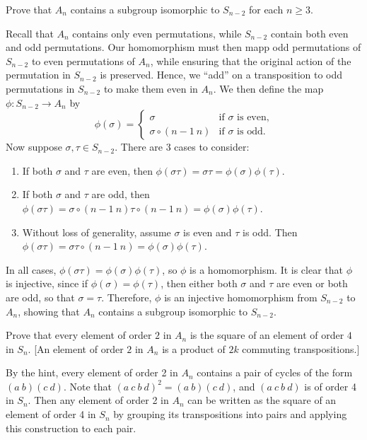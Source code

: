 \begin{problems}
\begin{sol}
    \end{sol}
    \item Prove that $A_n$ contains a subgroup isomorphic to $S_{n-2}$ for each $n\ge3$.
    \begin{sol}
        Recall that $A_n$ contains only even permutations, while $S_{n - 2}$ contain both even and odd permutations. Our homomorphism must then mapp odd permutations of $S_{n - 2}$ to even permutations of $A_n$, while ensuring that the original action of the permutation in $S_{n - 2}$ is preserved. Hence, we ``add'' on a transposition to odd permutations in $S_{n - 2}$ to make them even in $A_n$. We then define the map $\phi: S_{n - 2} \to A_n$ by
        \[\phi(\sigma) = 
        \begin{cases}
            \sigma & \text{if $\sigma$ is even,}\\
            \sigma \circ (n - 1\ n) & \text{if $\sigma$ is odd.}
        \end{cases}\]
        Now suppose $\sigma, \tau \in S_{n - 2}$. There are 3 cases to consider:
        \begin{enumerate}
            \item If both $\sigma$ and $\tau$ are even, then $\phi(\sigma\tau) = \sigma\tau = \phi(\sigma)\phi(\tau)$.
            \item If both $\sigma$ and $\tau$ are odd, then $\phi(\sigma\tau) = \sigma \circ (n - 1\ n)\tau \circ (n - 1\ n) = \phi(\sigma)\phi(\tau)$.
            \item Without loss of generality, assume $\sigma$ is even and $\tau$ is odd. Then $\phi(\sigma\tau) = \sigma\tau \circ (n - 1\ n) = \phi(\sigma)\phi(\tau)$.
        \end{enumerate}
        In all cases, $\phi(\sigma\tau) = \phi(\sigma)\phi(\tau)$, so $\phi$ is a homomorphism. It is clear that $\phi$ is injective, since if $\phi(\sigma) = \phi(\tau)$, then either both $\sigma$ and $\tau$ are even or both are odd, so that $\sigma = \tau$. Therefore, $\phi$ is an injective homomorphism from $S_{n - 2}$ to $A_n$, showing that $A_n$ contains a subgroup isomorphic to $S_{n - 2}$.
    \end{sol}
    \item Prove that every element of order $2$ in $A_n$ is the square of an element of order $4$ in $S_n$. [An element of order $2$ in $A_n$ is a product of $2k$ commuting transpositions.]
    \begin{sol}
        By the hint, every element of order 2 in $A_n$ contains a pair of cycles of the form $(a\ b)(c\ d)$. Note that $(a\ c\ b\ d)^2 = (a\ b)(c\ d)$, and $(a\ c\ b\ d)$ is of order 4 in $S_n$. Then any element of order 2 in $A_n$ can be written as the square of an element of order 4 in $S_n$ by grouping its transpositions into pairs and applying this construction to each pair.

\end{sol}
\end{problems}
